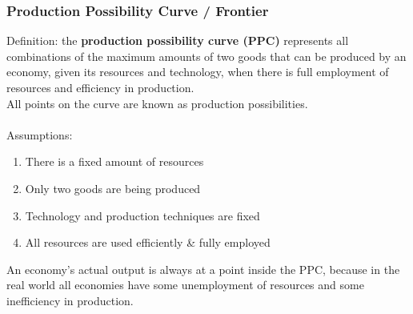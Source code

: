 \documentclass[a4paper,12pt]{article}
\newcommand{\needbold}[1]{\textcolor{red!70!black}{\textbf{#1}}}
\begin{document}
\subsubsection*{Production Possibility Curve / Frontier}
Definition: the \needbold{production possibility curve (PPC)} represents all combinations of the maximum amounts of two goods that can be produced by an economy, given its resources and technology, when there is full employment of resources and efficiency in production. \\
All points on the curve are known as production possibilities.\\\\
Assumptions:
\begin{enumerate}
  \item There is a fixed amount of resources
  \item Only two goods are being produced
  \item Technology and production techniques are fixed
  \item All resources are used efficiently \& fully employed
\end{enumerate}
An economy's actual output is always at a point inside the PPC, because in the real world all economies have some unemployment of resources and some inefficiency in production.
\end{document}
